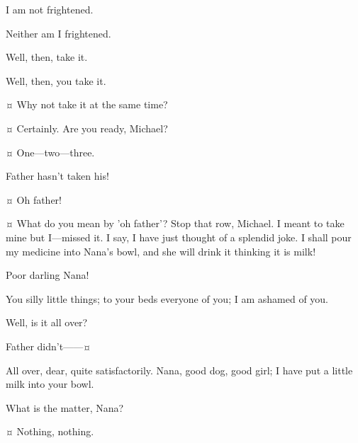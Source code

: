 \begin{drama}
\michaelspeaks
I am not frightened.

\mrdarlingspeaks
Neither am I frightened.

\michaelspeaks
Well, then, take it.

\mrdarlingspeaks
Well, then, you take it.

\wendyspeaks {}¤
Why not take it at the same time?

\mrdarlingspeaks {}¤
Certainly.
Are you ready, Michael?

\wendyspeaks {}¤
One—two—three.


\johnspeaks
Father hasn't taken his!


\wendyspeaks {}¤
Oh father!

\mrdarlingspeaks {}¤
What do you mean by 'oh father'?
Stop that row, Michael.
I meant to take mine but I—missed it.
I say, I have just thought of a splendid joke.
I shall pour my medicine into Nana's bowl, and she will drink it thinking it is milk!

\wendyspeaks
Poor darling Nana!

\mrdarlingspeaks
You silly little things; to your beds everyone of you; I am ashamed of you.


\mrsdarlingspeaks
Well, is it all over?

\michaelspeaks
Father didn't——¤

\mrdarlingspeaks
All over, dear, quite satisfactorily.
Nana, good dog, good girl; I have put a little milk into your bowl.

\mrsdarlingspeaks
What is the matter, Nana?

\mrdarlingspeaks {}¤
Nothing, nothing.


\end{drama}

